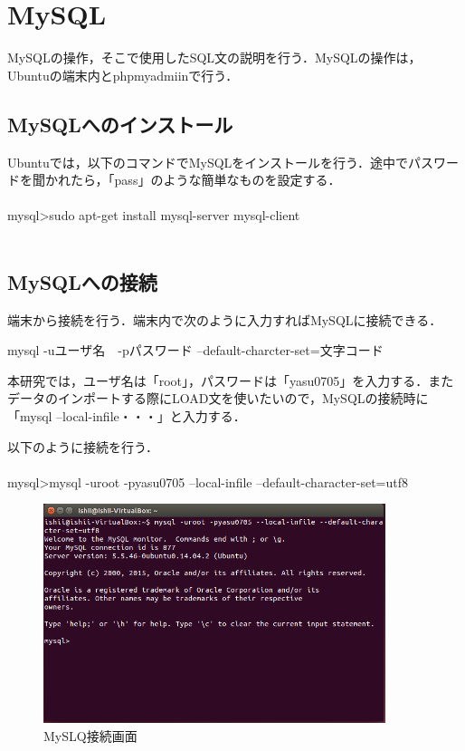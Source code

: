 \section{MySQL}

MySQLの操作，そこで使用したSQL文の説明を行う．MySQLの操作は，Ubuntuの端末内とphpmyadmiinで行う．

\subsection{MySQLへのインストール}

Ubuntuでは，以下のコマンドでMySQLをインストールを行う．途中でパスワードを聞かれたら，「pass」のような簡単なものを設定する． \\
\\
mysql>sudo apt-get install mysql-server mysql-client \\
\\

\subsection{MySQLへの接続}

端末から接続を行う．端末内で次のように入力すればMySQLに接続できる．

mysql -uユーザ名　-pパスワード --default-charcter-set=文字コード

本研究では，ユーザ名は「root」，パスワードは「yasu0705」を入力する．またデータのインポートする際にLOAD文を使いたいので，MySQLの接続時に「mysql --local-infile・・・」と入力する．

以下のように接続を行う． \\
\\
mysql>mysql -uroot -pyasu0705 --local-infile --default-character-set=utf8 \\

\begin{figure}[H]
\centering
\includegraphics[width=10cm]{MySQL_connection.png}
\caption{MySLQ接続画面}\label{サンプル図}
\end{figure}


